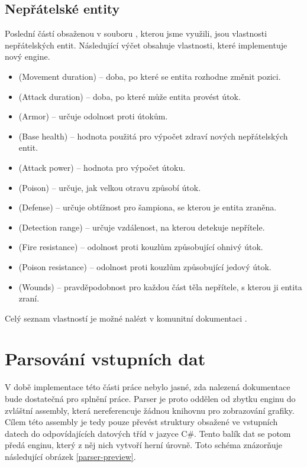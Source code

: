 \subsection{Nepřátelské entity}\label{properties-creatures}

Poslední částí obsaženou v souboru , kterou jsme využili, jsou vlastnosti nepřátelských entit.
Následující výčet obsahuje vlastnosti, které implementuje nový engine. 
\begin{itemize}
\item {} (Movement duration) -- doba, po které se entita rozhodne změnit pozici.
\item {} (Attack duration) -- doba, po které může entita provést útok.
\item {} (Armor) -- určuje odolnost proti útokům.
\item {} (Base health) -- hodnota použitá pro výpočet zdraví nových nepřátelských entit.
\item {} (Attack power) -- hodnota pro výpočet útoku.
\item {} (Poison)  -- určuje, jak velkou otravu způsobí útok. 
\item {} (Defense) -- určuje obtížnost pro šampiona, se kterou je entita zraněna. 
\item {} (Detection range) -- určuje vzdálenost, na kterou detekuje nepřítele. 
\item {} (Fire resistance) -- odolnost proti kouzlům způsobující ohnivý útok.
\item {} (Poison resistance) -- odolnost proti kouzlům způsobující jedový útok.
\item {} (Wounds) -- pravděpodobnost pro každou část těla nepřítele, s kterou ji entita zraní.
\end{itemize}

Celý seznam vlastností je možné nalézt v komunitní dokumentaci \cite{DMCreatures}.


\section{Parsování vstupních dat}\label{level-parsing}

V době implementace této části práce nebylo jasné, zda nalezená dokumentace \cite{TechnicalDocumentationFontanel05} bude dostatečná
pro splnění práce. Parser je proto oddělen od zbytku enginu do zvláštní assembly, která nereferencuje žádnou knihovnu
pro zobrazování grafiky. Cílem této assembly je tedy pouze převést struktury obsažené ve vstupních datech do odpovídajících
datových tříd v jazyce C\#. Tento balík dat se potom předá enginu, který z něj nich vytvoří herní úrovně. Toto schéma 
znázorňuje následující obrázek \ref{parser-preview}.

